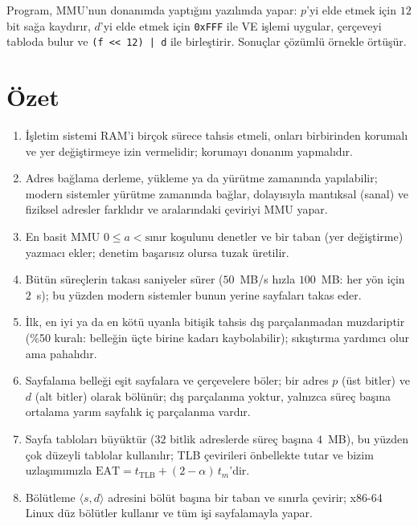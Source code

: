 \documentclass[11pt,a4paper]{article}
\begin{document}
Program, MMU'nun donanımda yaptığını yazılımda yapar: $p$'yi elde etmek için $12$ bit sağa kaydırır, $d$'yi elde etmek için \texttt{0xFFF} ile VE işlemi uygular, çerçeveyi tabloda bulur ve \texttt{(f << 12) | d} ile birleştirir. Sonuçlar çözümlü örnekle örtüşür.

\section{Özet}

\begin{keyidea}
\begin{enumerate}[leftmargin=1.4em]
  \item İşletim sistemi RAM'i birçok sürece tahsis etmeli, onları birbirinden korumalı ve yer değiştirmeye izin vermelidir; korumayı donanım yapmalıdır.
  \item Adres bağlama derleme, yükleme ya da yürütme zamanında yapılabilir; modern sistemler yürütme zamanında bağlar, dolayısıyla mantıksal (sanal) ve fiziksel adresler farklıdır ve aralarındaki çeviriyi MMU yapar.
  \item En basit MMU $0 \le a < \text{sınır}$ koşulunu denetler ve bir taban (yer değiştirme) yazmacı ekler; denetim başarısız olursa tuzak üretilir.
  \item Bütün süreçlerin takası saniyeler sürer ($50$~MB/s hızla $100$~MB: her yön için $2$~s); bu yüzden modern sistemler bunun yerine sayfaları takas eder.
  \item İlk, en iyi ya da en kötü uyanla bitişik tahsis dış parçalanmadan muzdariptir (\%50 kuralı: belleğin üçte birine kadarı kaybolabilir); sıkıştırma yardımcı olur ama pahalıdır.
  \item Sayfalama belleği eşit sayfalara ve çerçevelere böler; bir adres $p$ (üst bitler) ve $d$ (alt bitler) olarak bölünür; dış parçalanma yoktur, yalnızca süreç başına ortalama yarım sayfalık iç parçalanma vardır.
  \item Sayfa tabloları büyüktür ($32$ bitlik adreslerde süreç başına $4$~MB), bu yüzden çok düzeyli tablolar kullanılır; TLB çevirileri önbellekte tutar ve bizim uzlaşımımızla $\text{EAT} = t_{\text{TLB}} + (2-\alpha)\,t_{m}$'dir.
  \item Bölütleme $\langle s, d\rangle$ adresini bölüt başına bir taban ve sınırla çevirir; x86-64 Linux düz bölütler kullanır ve tüm işi sayfalamayla yapar.
\end{enumerate}
\end{keyidea}
\end{document}
